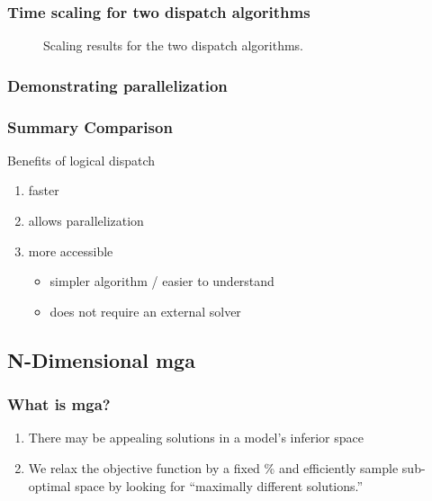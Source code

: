\begin{frame}
    \frametitle{Time scaling for two dispatch algorithms}

    \begin{figure}
        \centering
        \resizebox{0.75\columnwidth}{!}{}
        \caption{Scaling results for the two dispatch algorithms. }
        \label{fig:time-scaling}
    \end{figure}
    
\end{frame}


\begin{frame}
    \frametitle{Demonstrating parallelization}

    \begin{figure}
        \centering
        \resizebox{0.75\columnwidth}{!}{}
        \caption{}
        \label{fig:parallel}
    \end{figure}
\end{frame}

\begin{frame}
    \frametitle{Summary Comparison}

    Benefits of logical dispatch

    \begin{enumerate}
        \item faster
        \item allows parallelization
        \item more accessible
        \begin{itemize}
            \item simpler algorithm / easier to understand
            \item does not require an external solver
        \end{itemize}
    \end{enumerate}
    
\end{frame}


\subsection{N-Dimensional \gls{mga}}

\begin{frame}
    \frametitle{What is \gls{mga}?}

     \begin{enumerate}
        \item There may be appealing solutions in a model's inferior space
        \item We relax the objective function by a fixed \% and efficiently sample
        sub-optimal space by looking for ``maximally different solutions.''
     \end{enumerate}

\end{frame}

